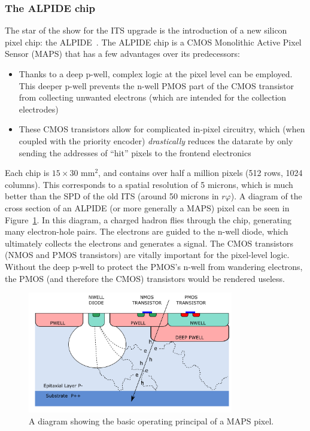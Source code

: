 \subsubsection{The ALPIDE chip}
The star of the show for the ITS upgrade is the introduction of a new silicon pixel chip: the ALPIDE~\cite{ALPIDE}. The ALPIDE chip is a CMOS Monolithic Active Pixel Sensor (MAPS) that has a few advantages over its predecessors:
\begin{itemize}
    \item Thanks to a deep p-well, complex logic at the pixel level can be employed. This deeper p-well prevents the n-well PMOS part of the CMOS transistor from collecting unwanted electrons (which are intended for the collection electrodes)
    \item These CMOS transistors allow for complicated in-pixel circuitry, which (when coupled with the priority encoder) \textit{drastically} reduces the datarate by only sending the addresses of ``hit'' pixels to the frontend electronics
\end{itemize}
Each chip is $15\times30$ mm$^2$, and contains over half a million pixels (512 rows, 1024 columns). This corresponds to a spatial resolution of 5 microns, which is much better than the SPD of the old ITS (around 50 microns in $r\varphi$). A diagram of the cross section of an ALPIDE (or more generally a MAPS) pixel can be seen in Figure~\ref{fig:alpide_diagram}. In this diagram, a charged hadron flies through the chip, generating many electron-hole pairs. The electrons are guided to the n-well diode, which ultimately collects the electrons and generates a signal. The CMOS transistors (NMOS and PMOS transistors) are vitally important for the pixel-level logic. Without the deep p-well to protect the PMOS's n-well from wandering electrons, the PMOS (and therefore the CMOS) transistors would be rendered useless.

\begin{figure}
    \centering
    \includegraphics[width=0.8\textwidth]{figures/experiment/alpide_cross.png}
    \caption{A diagram showing the basic operating principal of a MAPS pixel.}
    \label{fig:alpide_diagram}
\end{figure}

